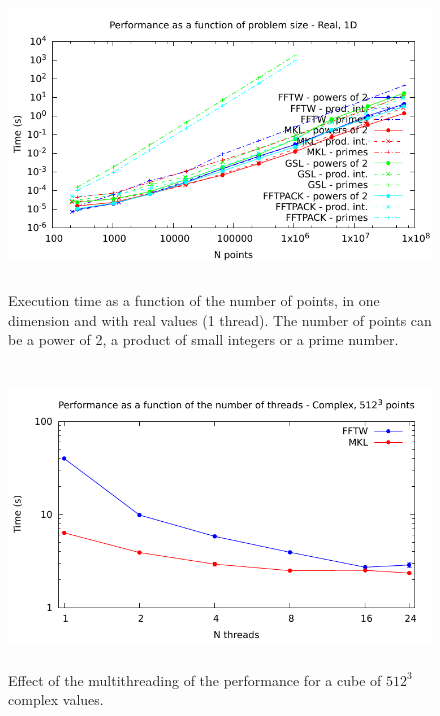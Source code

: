 \documentclass[12pt, a4paper]{article}
\begin{document}
\begin{figure}[H]
\captionsetup{width=0.6\textwidth}
\centering
\includegraphics[height=8cm]{graphs/performance1dr/performance1dr.pdf}
\caption{Execution time as a function of the number of points, in one dimension and with real values (1 thread). The number of points can be a power of 2, a product of small integers or a prime number.}
\label{perf1d}
\end{figure}

\begin{figure}[H]
\captionsetup{width=0.6\textwidth}
\centering
\includegraphics[height=8cm]{graphs/multithreading/multithreading.pdf}
\caption{Effect of the multithreading of the performance for a cube of $512^3$ complex values.}
\label{perfmt}
\end{figure}  
\end{document}
